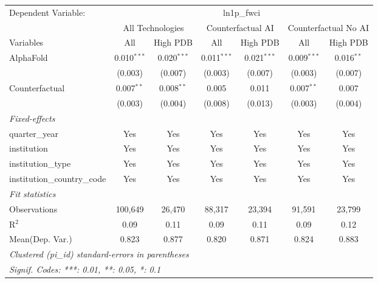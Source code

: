 \begingroup
\centering
\begin{tabular}{lcccccc}
   \tabularnewline \midrule \midrule
   Dependent Variable: & \multicolumn{6}{c}{ln1p\_fwci}\\
 & \multicolumn{2}{c}{All Technologies} & \multicolumn{2}{c}{Counterfactual AI} & \multicolumn{2}{c}{Counterfactual No AI} \\
\cmidrule(lr){1-1}\cmidrule(lr){2-3} \cmidrule(lr){4-5} \cmidrule(lr){6-7}
Variables & \multicolumn{1}{c}{All} & \multicolumn{1}{c}{High PDB} & \multicolumn{1}{c}{All} & \multicolumn{1}{c}{High PDB} & \multicolumn{1}{c}{All} & \multicolumn{1}{c}{High PDB} \\
\cmidrule(lr){1-1}\cmidrule(lr){2-2} \cmidrule(lr){3-3} \cmidrule(lr){4-4} \cmidrule(lr){5-5} \cmidrule(lr){6-6} \cmidrule(lr){7-7}
   AlphaFold                    & 0.010$^{***}$ & 0.020$^{***}$ & 0.011$^{***}$ & 0.021$^{***}$ & 0.009$^{***}$ & 0.016$^{**}$\\   
                                & (0.003)       & (0.007)       & (0.003)       & (0.007)       & (0.003)       & (0.007)\\   
   Counterfactual               & 0.007$^{**}$  & 0.008$^{**}$  & 0.005         & 0.011         & 0.007$^{**}$  & 0.007\\   
                                & (0.003)       & (0.004)       & (0.008)       & (0.013)       & (0.003)       & (0.004)\\   
   \midrule
   \emph{Fixed-effects}\\
   quarter\_year                & Yes           & Yes           & Yes           & Yes           & Yes           & Yes\\  
   institution                  & Yes           & Yes           & Yes           & Yes           & Yes           & Yes\\  
   institution\_type            & Yes           & Yes           & Yes           & Yes           & Yes           & Yes\\  
   institution\_country\_code   & Yes           & Yes           & Yes           & Yes           & Yes           & Yes\\  
   \midrule
   \emph{Fit statistics}\\
   Observations                 & 100,649       & 26,470        & 88,317        & 23,394        & 91,591        & 23,799\\  
   R$^2$                        & 0.09          & 0.11          & 0.09          & 0.11          & 0.09          & 0.12\\  
Mean(Dep. Var.) & 0.823 & 0.877 & 0.820 & 0.871 & 0.824 & 0.883 \\
   \midrule \midrule
   \multicolumn{7}{l}{\emph{Clustered (pi\_id) standard-errors in parentheses}}\\
   \multicolumn{7}{l}{\emph{Signif. Codes: ***: 0.01, **: 0.05, *: 0.1}}\\
\end{tabular}
\par\endgroup
